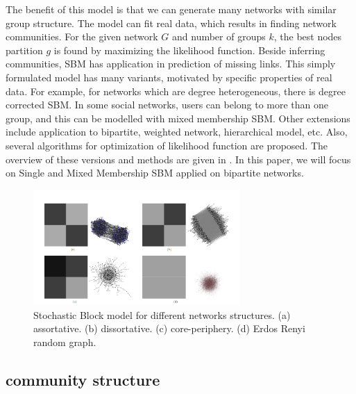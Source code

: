 The benefit of this model is that we can generate many networks with similar group structure. The model can fit real data, which results in finding network communities. For the given network $G$ and number of groups $k$, the best nodes partition $g$ is found by maximizing the likelihood function. Beside inferring communities, SBM has application in prediction of missing links. This simply formulated model has many variants, motivated by specific properties of real data. For example, for networks which are degree heterogeneous, there is degree corrected SBM. In some social networks, users can belong to more than one group, and this can be modelled with mixed membership SBM. Other extensions include application to bipartite, weighted network, hierarchical model, etc. Also, several algorithms for optimization of likelihood function are proposed. The overview of these versions and methods are given in \cite{comparison}. In this paper, we will focus on Single and Mixed Membership SBM applied on bipartite networks.  
\begin{figure}
	\centering
	\includegraphics[width=0.7\textwidth]{Figures/structures.png}
	\caption{Stochastic Block model for different networks structures. (a) assortative. (b) dissortative. (c) core-periphery. (d) Erdos Renyi random graph.}
	\label{fig:SBM}
\end{figure}

\subsection{community structure}

